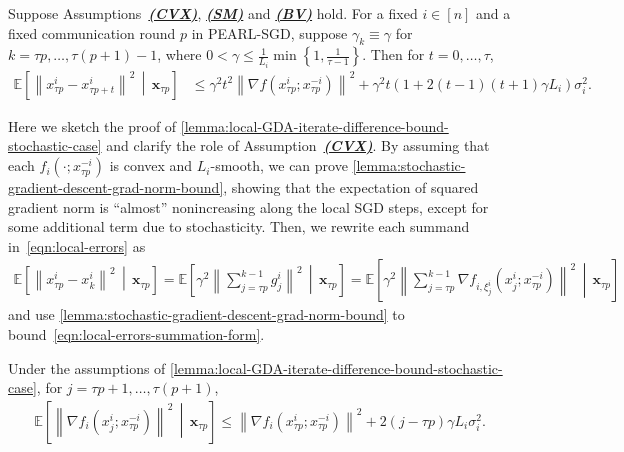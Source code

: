 \documentclass{article}
\newcommand{\algname}[1]{{\color{PineGreen}\sf  #1}\xspace}
\newcommand{\vx}{{\mathbf{x}}}
\newcommand{\sqnorm}[1]{\left\| #1 \right\|^2}
\newcommand{\abbvname}{\algname{PEARL-SGD}}
\theoremstyle{plain}
\theoremstyle{remark}
\begin{document}
\begin{lemma}
\label{lemma:local-GDA-iterate-difference-bound-stochastic-case}
Suppose Assumptions~\hyperref[assumption:convexity]{\textbf{\emph{(CVX)}}}, \hyperref[assumption:smoothness]{\textbf{\emph{(SM)}}} and  \hyperref[assumption:noise]{\textbf{\emph{(BV)}}} hold.
For a fixed $i\in [n]$ and a fixed communication round $p$ in \abbvname, suppose $\gamma_k \equiv \gamma$ for $k=\tau p, \dots, \tau(p+1) - 1$, where $0 < \gamma \le \frac{1}{L_i} \min\left\{ 1, \frac{1}{\tau-1} \right\}$.
Then for $t=0,\dots,\tau$,
\begin{align*}
    \mathbb{E} \left[ \sqnorm{x_{\tau p}^i - x_{\tau p + t}^i} \,\middle|\, \vx_{\tau p} \right]  & \le \gamma^2 t^2 \sqnorm{\nabla f(x_{\tau p}^i; x_{\tau p}^{-i})} + \gamma^2 t \left(1 + 2(t-1)(t+1) \gamma L_i \right) \sigma_i^2 .
\end{align*}
\end{lemma}

Here we sketch the proof of \cref{lemma:local-GDA-iterate-difference-bound-stochastic-case} and clarify the role of Assumption~\hyperref[assumption:convexity]{\textbf{\emph{(CVX)}}}. 
By assuming that each $f_i(\cdot; x_{\tau p}^{-i})$ is convex and $L_i$-smooth, we can prove \cref{lemma:stochastic-gradient-descent-grad-norm-bound}, showing that the expectation of squared gradient norm is ``almost'' nonincreasing along the local SGD steps, except for some additional term due to stochasticity.
Then, we rewrite each summand in~\eqref{eqn:local-errors} as
\begin{align}
\label{eqn:local-errors-summation-form}
    \mathbb{E} \left[ \sqnorm{x_{\tau p}^i - x_k^i} \,\middle|\, \vx_{\tau p} \right] = \mathbb{E} \left[ \gamma^2 \sqnorm{\sum_{j=\tau p}^{k-1} g_j^i} \,\middle|\, \vx_{\tau p} \right] = \mathbb{E} \left[ \gamma^2 \sqnorm{\sum_{j=\tau p}^{k-1} \nabla f_{i,\xi_j^i} (x_j^i; x_{\tau p}^{-i})} \,\middle|\, \vx_{\tau p} \right]
\end{align}
and use \cref{lemma:stochastic-gradient-descent-grad-norm-bound} to bound~\eqref{eqn:local-errors-summation-form}.

\begin{lemma}
\label{lemma:stochastic-gradient-descent-grad-norm-bound}
Under the assumptions of \cref{lemma:local-GDA-iterate-difference-bound-stochastic-case}, for $j=\tau p+1,\dots,\tau(p+1)$,
\begin{align*}
    \mathbb{E} \left[ \sqnorm{\nabla f_i (x_j^i; x_{\tau p}^{-i})} \,\middle|\, \vx_{\tau p} \right] \le \sqnorm{\nabla f_i (x_{\tau p}^i; x_{\tau p}^{-i})} + 2(j-\tau p) \gamma L_i \sigma_i^2  .
\end{align*}
\end{lemma}
\end{document}

